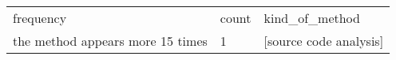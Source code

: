 \begin{table}[]
\begin{tabular}{lll}
frequency                         & count & kind\_of\_method                                                                                                                                                                                                                                                                                                                                                                                                                                                                                                                                                                                                                                                                                                                                                                                                                                                                                                                                                                                                                                                                                                                                                                                                                                                                                                                                                                                                                                                \\
the method appears more 15 times  & 1     & {[}source code analysis{]}                                                                                                                                                                                                                                                                                                                                                                                                                                                                                                                                                                                                                                                                                                                                                                                                                                                                                                                                                                                                                                                                                                                                                                                                                                                                                                                                                                                                                                      \\

\end{tabular}
\end{table}
